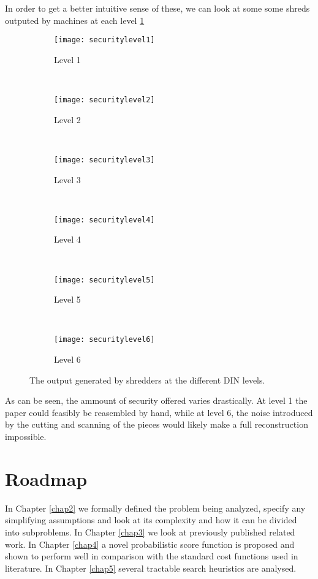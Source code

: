 In order to get a better intuitive sense of these, we can look at some some shreds outputed by machines at each level \ref{fig:dinOut}

\begin{figure}[h]
        \centering
        \begin{subfigure}[b]{0.15\textwidth}
                \centering
                \texttt{[image: securitylevel1]}
                \caption{Level 1}
        \end{subfigure}
        ~ 
        \begin{subfigure}[b]{0.15\textwidth}
                \centering
                \texttt{[image: securitylevel2]}
                \caption{Level 2}
        \end{subfigure}
        ~ 
        \begin{subfigure}[b]{0.15\textwidth}
                \centering
                \texttt{[image: securitylevel3]}
                \caption{Level 3}
        \end{subfigure}
        ~ 
        \begin{subfigure}[b]{0.15\textwidth}
                \centering
                \texttt{[image: securitylevel4]}
                \caption{Level 4}
        \end{subfigure}
        ~ 
        \begin{subfigure}[b]{0.15\textwidth}
                \centering
                \texttt{[image: securitylevel5]}
                \caption{Level 5}
        \end{subfigure}
        ~ 
        \begin{subfigure}[b]{0.15\textwidth}
                \centering
                \texttt{[image: securitylevel6]}
                \caption{Level 6}
        \end{subfigure}
        \caption{The output generated by shredders at the different DIN levels.\cite{P16} }
        \label{fig:dinOut}
\end{figure}

As can be seen, the ammount of security offered varies drastically. At level 1 the paper could feasibly be reasembled by hand, while at level 6, the noise introduced by the cutting and scanning of the pieces would likely make a full reconstruction impossible.

\section{Roadmap}

In Chapter \ref{chap2} we formally defined the problem being analyzed, specify any simplifying assumptions and look at its complexity and how it can be divided into subproblems. In Chapter \ref{chap3} we look at previously published related work. In Chapter \ref{chap4} a novel probabilistic score function is proposed and shown to perform well in comparison with the standard cost functions used in literature. In Chapter \ref{chap5} several tractable search heuristics are analysed. 
